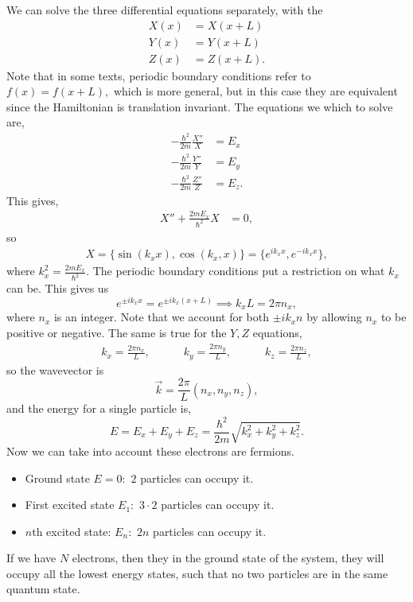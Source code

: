 \documentclass{article}
\numberwithin{equation}{section}
\begin{document}
We can solve the three differential equations separately, with the 
\begin{align*}
    X(x) &= X(x+L) \\ 
    Y(x) &= Y(x+L) \\ 
    Z(x) &= Z(x+L).
\end{align*}
Note that in some texts, periodic boundary conditions refer to $f(x)=f(x+L),$ which is more general, but in this case they are equivalent since the Hamiltonian is translation invariant. The equations we which to solve are,
\begin{align*}
    -\frac{\hbar^2}{2m}\frac{X''}{X} &= E_x \\ 
    -\frac{\hbar^2}{2m}\frac{Y''}{Y} &= E_y \\
    -\frac{\hbar^2}{2m}\frac{Z''}{Z} &= E_z.
\end{align*}
This gives,
\begin{align*}
    X'' + \frac{2mE_x}{\hbar^2}X &= 0,
\end{align*}
so 
\begin{align*}
    X =\{\sin(k_xx),\cos(k_x,x)\} = \{e^{ik_xx},e^{-ik_xx}\},
\end{align*}
where $k_x^2 = \frac{2mE_x}{\hbar^2}.$ The periodic boundary conditions put a restriction on what $k_x$ can be. This gives us 
\begin{equation*}
    e^{\pm ik_xx} = e^{\pm ik_x(x+L)} \implies k_xL = 2\pi n_x,
\end{equation*}
where $n_x$ is an integer. Note that we account for both $\pm ik_xn$ by allowing $n_x$ to be positive or negative. The same is true for the $Y,Z$ equations,
\begin{align*}
    k_x=\frac{2\pi n_x}{L},\quad\quad\quad k_y=\frac{2\pi n_y}{L},\quad\quad\quad k_z=\frac{2\pi n_z}{L},
\end{align*}
so the wavevector is 
\begin{equation*}
    \vec{k} = \frac{2\pi}{L}(n_x,n_y,n_z),
\end{equation*}
and the energy for a single particle is,
\begin{equation*}
    E = E_x+E_y+E_z = \frac{\hbar^2}{2m} \sqrt{k_x^2+k_y^2+k_z^2}.
\end{equation*}
Now we can take into account these electrons are fermions.
\begin{itemize}
    \item Ground state $E=0:$ $2$ particles can occupy it.
    \item First excited state $E_1:$ $3\cdot 2$ particles can occupy it.
    \item $n$th excited state: $E_n:$ $2n$ particles can occupy it.
\end{itemize}
If we have $N$ electrons, then they in the ground state of the system, they will occupy all the lowest energy states, such that no two particles are in the same quantum state.
\end{document}
